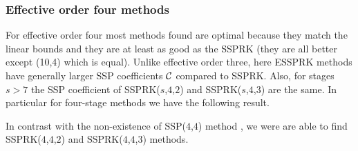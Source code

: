 \subsubsection{Effective order four methods}\label{subsubsection3.4.2}


For effective order four most methods found are optimal because they match the linear bounds and they are at least as good as the SSPRK (they are all better except (10,4) which is equal). Unlike effective order three, here ESSPRK methods have generally larger SSP coefficients $\mathcal{C}$ compared to SSPRK. Also, for stages \( s > 7 \) the SSP coefficient of SSPRK(\( s \),\( 4 \),\( 2 \)) and SSPRK(\( s \),\( 4 \),\( 3 \)) are the same. In particular for four-stage methods we have the following result.

\begin{result}
  In contrast with the non-existence of SSP(\( 4 \),\( 4 \)) method
  \cite{Gottlieb1998,Ruuth2002}, we were are able to
  find SSPRK(\( 4 \),\( 4 \),\( 2 \)) and SSPRK(\( 4 \),\( 4 \),\( 3
  \)) methods.
\end{result}








%
%


